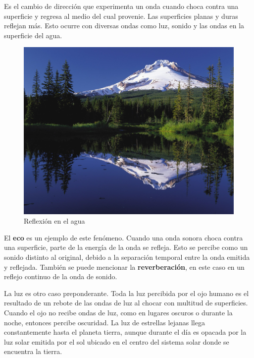 Es el cambio de dirección que experimenta un onda cuando choca contra una superficie y regresa al medio del cual provenie. Las superficies planas y duras reflejan más. Esto ocurre con diversas ondas como luz, sonido y las ondas en la superficie del agua.

\begin{figure}[H]
  \centering
  \includegraphics[scale=0.15]{imagenes/reflexion_monte.png}
  \caption{Reflexión en el agua\cite{wikireflexion}}
\end{figure}

El \textbf{eco} es un ejemplo de este fenómeno. Cuando una onda sonora choca contra una superficie, parte de la energía de la onda se refleja. Esto se percibe como un sonido distinto al original, debido a la separación temporal entre la onda emitida y reflejada. También se puede mencionar la \textbf{reverberación}, en este caso en un reflejo continuo de la onda de sonido.

La luz es otro caso preponderante. Toda la luz percibida por el ojo humano es el resultado de un rebote de las ondas de luz al chocar con multitud de superficies. Cuando el ojo no recibe ondas de luz, como en lugares oscuros o durante la noche, entonces percibe oscuridad. La luz de estrellas lejanas llega constantemente hasta el planeta tierra, aunque durante el día es opacada por la luz solar emitida por el sol ubicado en el centro del sistema solar donde se encuentra la tierra.
